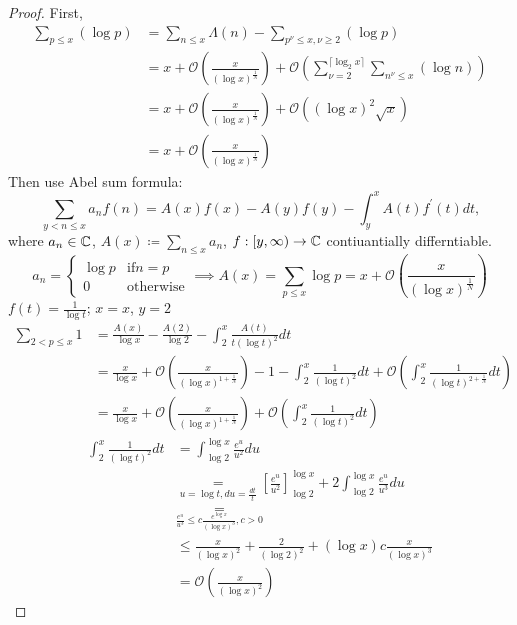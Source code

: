 \documentclass[NumTh.tex]{subfiles}
\begin{document}
\begin{proof}
  First, 
  \begin{align*}
    \sum_{p \leq x} (\log p) &= \sum_{n \leq x} \Lambda(n) - \sum_{p^\nu \leq x, \nu \geq 2} (\log p) \\
    &= x + \mathcal{O} ( \frac{x}{(\log x)^{\frac{1}{N}}}) + \mathcal{O}( \sum_{\nu = 2}^{\lceil \log_2 x \rceil} \sum_{n^\nu \leq x} (\log n)) \\
    &= x + \mathcal{O}(\frac{x}{(\log x)^{\frac{1}{N}}}) + \mathcal{O} ( (\log x)^2 \sqrt{x}) \\
    &= x + \mathcal{O}( \frac{x}{(\log x)^{\frac{1}{N}}} )
  \end{align*}
  Then use Abel sum formula:
  \[ \sum_{y < n \leq x} a_n f(n) = A(x) f(x) - A(y) f(y) - \int_y^x A(t) f^\prime(t) dt \text{,} \]
  where $a_n \in \mathbb{C}$, $A(x) \coloneq \sum_{n \leq x} a_n$, $f: [y,\infty) \to \mathbb{C}$ contiuantially differntiable.
  \[ a_n =
  \begin{cases}
    \log p & \text{if} n = p \\
    0 & \text{otherwise}
  \end{cases}
  \implies A(x) = \sum_{p \leq x} \log p = x + \mathcal{O}(\frac{x}{(\log x)^{\frac{1}{N}}}) \]
  $f(t) = \frac{1}{\log t}$;
  $x = x$, $y = 2$
  \begin{align*}
    \sum_{2 < p \leq x} 1 &= \frac{A(x)}{\log x} - \frac{A(2)}{\log 2} - \int_2^x \frac{A(t)}{t (\log t)^2} dt \\
    &= \frac{x}{\log x} + \mathcal{O}(\frac{x}{(\log x)^{1+\frac{1}{N}}}) - 1 - \int_2^x \frac{1}{(\log t)^2} dt
  + \mathcal{O} ( \int_2^x \frac{1}{(\log t)^{2+\frac{1}{N}}}dt) \\
    &= \frac{x}{\log x} + \mathcal{O}( \frac{x}{(\log x)^{1 + \frac{1}{N}}}) + \mathcal{O}( \int_2^x \frac{1}{(\log t)^2}dt )
  \end{align*}
  \begin{align*}
    \int_2^x \frac{1}{(\log t)^2} dt &= \int_{\log 2}^{\log x} \frac{e^u}{u^2} du \\
  &\underset{u = \log t, du = \frac{dt}{t}}{=} [ \frac{e^u}{u^2}]_{\log 2}^{\log x} + 2 \int_{\log 2}^{\log x} \frac{e^u}{u^3} du \\
  &\underset{ \frac{e^u}{u^3} \leq c \frac{e^{\log x}}{(\log x)^3}, c > 0}{=} \\
  &\leq \frac{x}{(\log x)^2} + \frac{2}{(\log 2)^2} + (\log x)c \frac{x}{(\log x)^3} \\
  &= \mathcal{O}(\frac{x}{(\log x)^2}) 
  \end{align*}
\end{proof}
\end{document}
